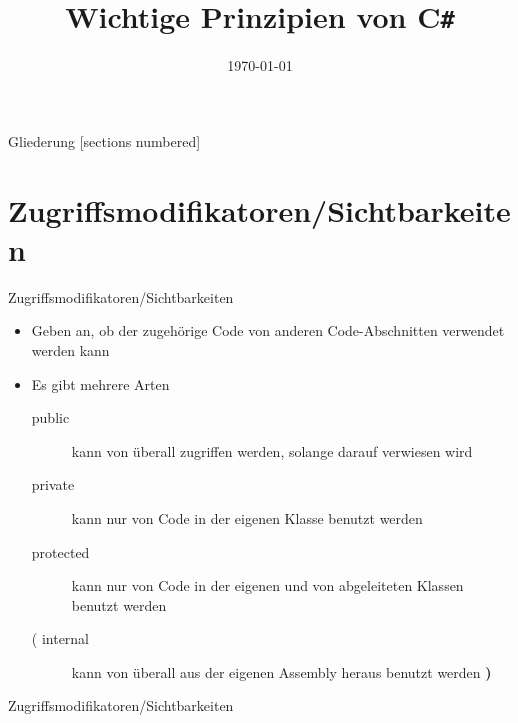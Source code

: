 



\title{Wichtige Prinzipien von C\texttt{\#}}
\date{\today}




\maketitle

\begin{frame}{Gliederung}
	[sections numbered]
	\tableofcontents
\end{frame}

\section{Zugriffsmodifikatoren/Sichtbarkeiten}
\begin{frame}{Zugriffsmodifikatoren/Sichtbarkeiten}
	\begin{itemize}
		\item Geben an, ob der zugehörige Code von anderen Code-Abschnitten verwendet werden kann
		\item Es gibt mehrere Arten
		\begin{description}
			\item[public] kann von überall zugriffen werden, solange darauf verwiesen wird
			\item[private] kann nur von Code in der eigenen Klasse benutzt werden
			\item[protected] kann nur von Code in der eigenen und von abgeleiteten Klassen benutzt werden
			\item[( internal] kann von überall aus der eigenen Assembly heraus benutzt werden \textbf{)}
		\end{description}
	\end{itemize}
\end{frame}

\begin{frame}{Zugriffsmodifikatoren/Sichtbarkeiten}
	
\end{frame}


